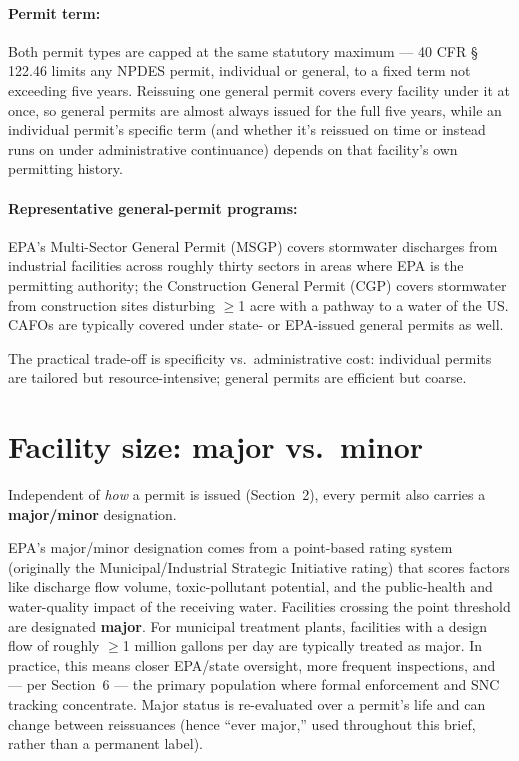 \documentclass[11pt]{article}
\begin{document}
\bigskip
\paragraph{Permit term:} Both permit types are capped at the same statutory
maximum --- 40 CFR \S\,122.46 limits any NPDES permit, individual or general, to a
fixed term not exceeding five years. Reissuing one general permit covers every
facility under it at once, so general permits are almost always issued for the
full five years, while an individual permit's specific term (and whether it's
reissued on time or instead runs on under administrative continuance) depends on
that facility's own permitting history.

\paragraph{Representative general-permit programs:} EPA's Multi-Sector General
Permit (MSGP) covers stormwater discharges from industrial facilities across
roughly thirty sectors in areas where EPA is the permitting authority; the
Construction General Permit (CGP) covers stormwater from construction sites
disturbing $\geq$1 acre with a pathway to a water of the US. CAFOs are typically
covered under state- or EPA-issued general permits as well.

The practical trade-off is specificity vs.\ administrative cost: individual
permits are tailored but resource-intensive; general permits are efficient but
coarse.

\section{Facility size: major vs.\ minor}
\label{sec:majorminor}

Independent of \textit{how} a permit is issued (Section~2), every permit also
carries a \textbf{major/minor} designation.

EPA's major/minor designation comes from a point-based rating system (originally
the Municipal/Industrial Strategic Initiative rating) that scores factors like
discharge flow volume, toxic-pollutant potential, and the public-health and
water-quality impact of the receiving water. Facilities crossing the point
threshold are designated \textbf{major}. For municipal treatment plants,
facilities with a design flow of roughly $\geq$1 million gallons per day are
typically treated as major. In practice, this means closer EPA/state oversight,
more frequent inspections, and --- per Section~6 --- the primary population where
formal enforcement and SNC tracking concentrate. Major status is re-evaluated
over a permit's life and can change between reissuances (hence ``ever major,''
used throughout this brief, rather than a permanent label).
\end{document}
